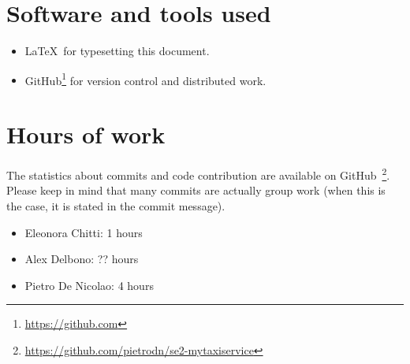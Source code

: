 \section{Software and tools used}
\begin{itemize}
    \item \LaTeX\, for typesetting this document.
    \item GitHub\footnote{\url{https://github.com}} for version control and distributed work.
\end{itemize}

\section{Hours of work}
The statistics about commits and code contribution are available on GitHub~\footnote{\url{https://github.com/pietrodn/se2-mytaxiservice}}.
Please keep in mind that many commits are actually group work (when this is the case, it is stated in the commit message).

\begin{itemize}
    \item Eleonora Chitti: 1 hours
    \item Alex Delbono: ?? hours
    \item Pietro De Nicolao: 4 hours
\end{itemize}
